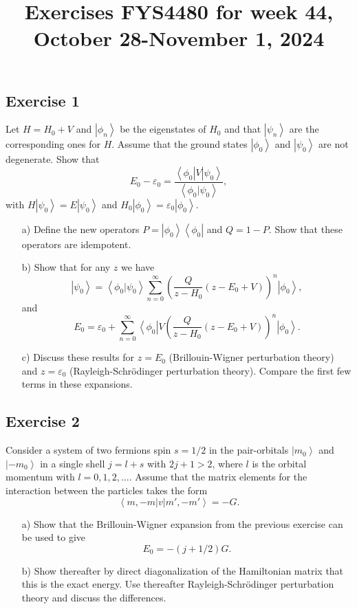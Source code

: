 \documentclass[prc]{revtex4}
\newcommand{\bra}[1]{\left\langle #1 \right|}
\newcommand{\ket}[1]{\left| #1 \right\rangle}
\begin{document}
\title{Exercises FYS4480 for week 44, October 28-November 1, 2024}

\maketitle

\subsection*{Exercise 1}
Let $H=H_0 +V$ and $\ket{\phi_n}$ be the eigenstates of $H_0$ and that
$\ket{\psi_n}$ are the corresponding ones for $H$. 
Assume that the ground states
$\ket{\phi_0}$ and $\ket{\psi_0}$ are not degenerate. Show that
\[
E_0 -\varepsilon_0 =\frac{\bra{\phi_0} V\ket{\psi_0}}
{\left\langle \phi_0 | \psi_0 \right\rangle},
\]
with $H\ket{\psi_0} =E\ket{\psi_0}$ and
$H_0\ket{\phi_0} =\varepsilon_0\ket{\phi_0}$.
\begin{enumerate}
\item[a)]
Define the new operators $P=\ket{\phi_0}\bra{\phi_0}$ and $Q=1-P$. Show that these operators are idempotent.
\item[b)]
Show that for any  $z$ we have 
\[
\ket{\psi_0}=
	    \left\langle \phi_0 | \psi_0 \right\rangle
	    \sum_{n=0}^{\infty}\left(\frac{Q}{z-H_0}(z-E_0+V)\right)^n
	    \ket{\phi_0},
\]
and
\[
E_0=\varepsilon_0+
    \sum_{n=0}^{\infty}\bra{\phi_0}V
    \left(\frac{Q}{z-H_0}(z-E_0+V)\right)^n
    \ket{\phi_0}.
\]
\item[c)]
Discuss these results  for $z=E_0$ (Brillouin-Wigner perturbation theory)
and $z=\varepsilon_0$ (Rayleigh-Schr\"{o}dinger perturbation theory).
Compare the first few terms in these expansions.
\end{enumerate}
\subsection*{Exercise 2}
Consider a system of two fermions spin $s=1/2$ in the pair-orbitals
$\ket{m_0}$ and $\ket{-m_0}$ in a single shell $j=l+s$ with $2j+1>2$, where $l$ is the orbital momentum with $l=0,1,2,\dots$.
Assume that the matrix elements for the interaction between the particles
takes the form
\[
\bra{m,-m}v\ket{m',-m'}=-G.
\]
\begin{enumerate}
\item[a)]
Show that the Brillouin-Wigner expansion from the previous exercise can be used
to give
\[
E_0=-(j+1/2)G.
\]
\item[b)] Show thereafter by direct diagonalization of the  Hamiltonian
matrix that this is the exact energy. Use thereafter 
Rayleigh-Schr\"{o}dinger perturbation theory and discuss the differences.
\end{enumerate}
\end{document}
